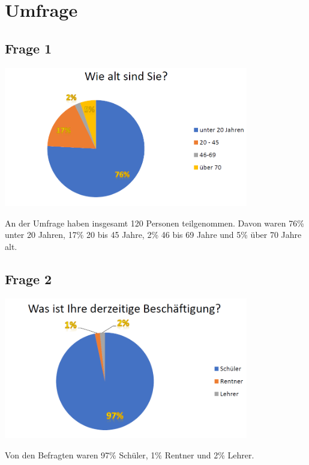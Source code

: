 \section{Umfrage}

\subsection{Frage 1}
\begin{center}
	\includegraphics[width=0.8\textwidth]{./img/umfrage1}
\end{center}
An der Umfrage haben insgesamt 120 Personen teilgenommen. Davon waren 76\% unter 20 Jahren, 17\% 20 bis 45 Jahre, 2\% 46 bis 69 Jahre und 5\% über 70 Jahre alt.

\subsection{Frage 2}
\begin{center}
	\includegraphics[width=0.8\textwidth]{./img/umfrage2}
\end{center}
Von den Befragten waren 97\% Schüler, 1\% Rentner und 2\% Lehrer.


